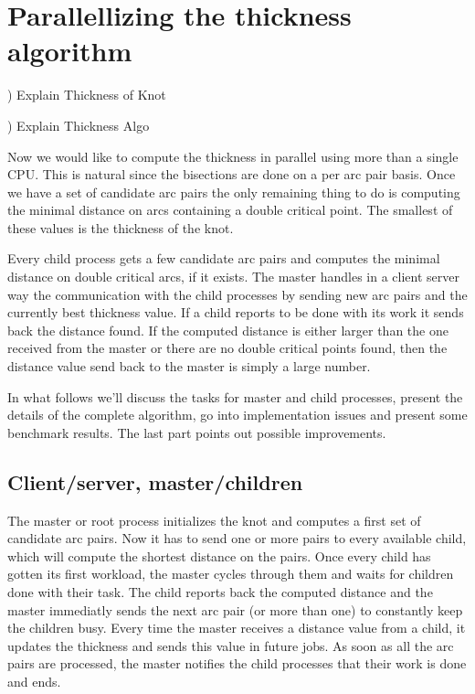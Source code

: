 \documentclass{article}
\begin{document}
\section{Parallellizing the thickness algorithm}

) Explain Thickness of Knot

) Explain Thickness Algo

Now we would like to compute the thickness in parallel using
more than a single CPU. This is natural since the bisections
are done on a per arc pair basis. Once we have a set of candidate
arc pairs the only remaining thing to do is computing the minimal
distance on arcs containing a double critical point. The smallest
of these values is the thickness of the knot.

Every child process gets a few candidate
arc pairs and computes the minimal distance on double critical
arcs, if it exists. The master handles in a client server way
the communication with the child processes by sending new arc
pairs and the currently best thickness value. If a child reports
to be done with its work it sends back the distance found. If the
computed distance is either larger than the one received from
the master or there are no double critical points found, then the
distance value send back to the master is simply a large number.

In what follows we'll discuss the tasks for master and child processes,
present the details of the complete algorithm, go into implementation
issues and present some benchmark results. The last part points out
possible improvements.

\subsection{Client/server, master/children}

The master or root process initializes the knot and computes a first
set of candidate arc pairs. Now it has to send one or more pairs to
every available child, which will compute the shortest distance on the
pairs. Once every child has gotten its first workload, the master cycles through
them and waits for children done with their task. The child reports back
the computed distance and the master immediatly sends the next arc pair (or more
than one) to constantly keep the children busy. Every time the master
receives a distance value from a child, it updates the thickness
and sends this value in future jobs. As soon as all the arc pairs are processed,
the master notifies the child processes that their work is done and
ends.
\end{document}
